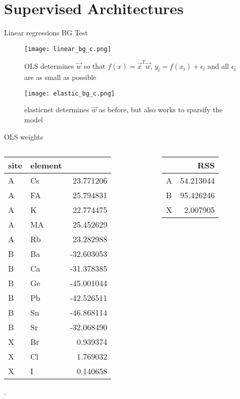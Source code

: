 \documentclass[10pt, compress]{beamer}
\begin{document}
\section{Supervised Architectures}
\label{sec:orgdd1f774}
\begin{frame}[allowframebreaks]{Linear regressions BG Test}
\begin{figure}[htbp]
\centering
\texttt{[image: linear\_bg\_c.png]}
\caption{OLS determines \(\vec{w}\) so that \(f(x) = \vec{x}^T\vec{w}\), \(y_i = f(x_i) + \epsilon_i\) and all \(\epsilon\)\textsubscript{i} are as small as possible}
\end{figure}

\begin{figure}[htbp]
\centering
\texttt{[image: elastic\_bg\_c.png]}
\caption{elasticnet determines \(\vec{w}\) as before, but also works to sparsify the model}
\end{figure}
\end{frame}
\begin{frame}[label={sec:orgbf158e6}]{OLS weights}
\begin{columns}
\begin{column}{0.7\columnwidth}
\begin{center}
\begin{tabular}{llr}
site & element & \\
\hline
A & Cs & 23.771206\\
A & FA & 25.794831\\
A & K & 22.774475\\
A & MA & 25.452629\\
A & Rb & 23.282988\\
B & Ba & -32.603053\\
B & Ca & -31.378385\\
B & Ge & -45.001044\\
B & Pb & -42.526511\\
B & Sn & -46.868114\\
B & Sr & -32.068490\\
X & Br & 0.939374\\
X & Cl & 1.769032\\
X & I & 0.140658\\
\end{tabular}
\end{center}
.
\end{column}
\begin{column}{0.3\columnwidth}
\begin{center}
\begin{tabular}{lr}
 & RSS\\
\hline
A & 54.213044\\
B & 95.426246\\
X & 2.007905\\
\end{tabular}
\end{center}
\end{column}
\end{columns}
\end{frame}
\end{document}
